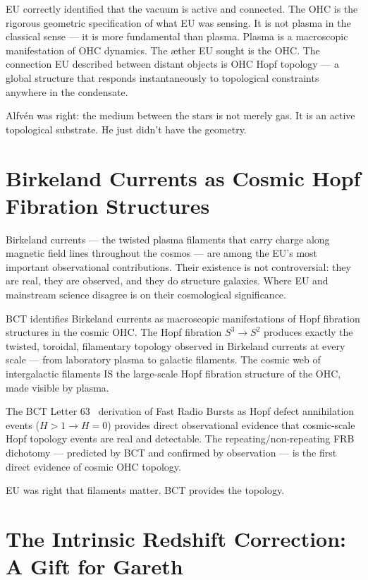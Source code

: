 \documentclass[twocolumn,10pt]{article}
\begin{document}
EU correctly identified that the vacuum is active and connected. The OHC
is the rigorous geometric specification of what EU was sensing. It is not
plasma in the classical sense --- it is more fundamental than plasma.
Plasma is a macroscopic manifestation of OHC dynamics. The æther EU sought
is the OHC. The connection EU described between distant objects is OHC
Hopf topology --- a global structure that responds instantaneously to
topological constraints anywhere in the condensate.

Alfv\'{e}n was right: the medium between the stars is not merely gas.
It is an active topological substrate. He just didn't have the geometry.

\section{Birkeland Currents as Cosmic Hopf Fibration Structures}

Birkeland currents --- the twisted plasma filaments that carry charge
along magnetic field lines throughout the cosmos --- are among the EU's
most important observational contributions. Their existence is not
controversial: they are real, they are observed, and they do structure
galaxies. Where EU and mainstream science disagree is on their
cosmological significance.

BCT identifies Birkeland currents as macroscopic manifestations of
Hopf fibration structures in the cosmic OHC. The Hopf fibration
$S^3 \to S^2$ produces exactly the twisted, toroidal, filamentary
topology observed in Birkeland currents at every scale --- from
laboratory plasma to galactic filaments. The cosmic web of
intergalactic filaments IS the large-scale Hopf fibration structure
of the OHC, made visible by plasma.

The BCT Letter 63~\cite{bct_l63} derivation of Fast Radio Bursts as
Hopf defect annihilation events ($H > 1 \to H = 0$) provides
direct observational evidence that cosmic-scale Hopf topology events
are real and detectable. The repeating/non-repeating FRB dichotomy
--- predicted by BCT and confirmed by observation --- is the first
direct evidence of cosmic OHC topology.

EU was right that filaments matter. BCT provides the topology.

\section{The Intrinsic Redshift Correction: A Gift for Gareth}
\end{document}
